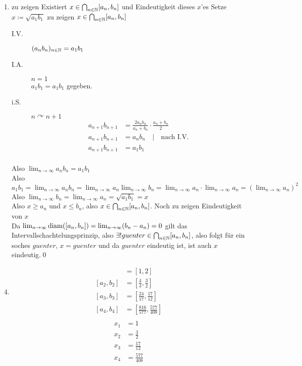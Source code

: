 \documentclass{gadsescript}
\begin{document}
\begin{proof*}
\begin{enumerate}[label=(\alph*)]
		\item zu zeigen Existiert $ x \in \bigcap_{n \in \mathbb{N}} [a_n, b_n] $ und Eindeutigkeit dieses $ x $'es
			Setze $ x \coloneqq \sqrt{a_1b_1}  $ zu zeigen $ x \in \bigcap_{n \in \mathbb{N}} [a_n, b_n] $
			\begin{description}
				\item[I.V.] $ (a_n b_n)_{n \in \mathbb{N} } = a_1b_1 $ 
				\item[I.A.] $ n = 1 $\\
					$ a_1 b_1 = a_1b_1 $ gegeben.
				\item[i.S.] $ n \curvearrowright n+1 $
					\begin{align*}
						a_{n+1}b_{n+1} &= \frac{ 2a_nb_n }{ a_n + b_n } \cdot \frac{ a_n + b_n }{ 2 } \\
						a_{n+1}b_{n+1} &= a_n b_n \quad | \quad \text{nach I.V.} \\
						a_{n+1}b_{n+1} &= a_1b_1 \\
					\end{align*}
			\end{description}
			Also $ \lim_{n \to \infty} a_nb_n = a_1b_1 $\\
			Also $ a_1b_1 = \lim_{n \to \infty} a_nb_n = \lim_{n \to \infty} a_n \lim_{n \to \infty} b_n = \lim_{n \to \infty} a_n \cdot \lim_{n \to \infty} a_n = \left( \lim_{n \to \infty} a_n \right)^2 $\\
			Also $ \lim_{n \to \infty} b_n = \lim_{n \to \infty} a_n = \sqrt{a_1b_1} = x$\\
			Also $ x \geq a_n $ und $ x \leq b_n $, also $ x \in \bigcap_{n \in \mathbb{N} } [a_n, b_n] $. Noch zu zeigen Eindeutigkeit von $ x $\\
			Da $ \lim_{n \to \infty} \operatorname{diam}([a_n, b_n]) = \lim_{n \to \infty} (b_n - a_n) = 0 $ gilt das Intervallschachtelungsprinzip, also $ \exists ! guenter \in \bigcap_{n \in \mathbb{N} } [a_n, b_n] $, also folgt für ein soches $ guenter $, $ x = guenter $ und da $ guenter $ eindeutig ist, ist auch $ x $ eindeutig.\qed
	\end{enumerate}
\end{proof*}
\begin{enumerate}[label=(\alph*)]
	\setcounter{enumi}{3}
	\item 
		\begin{align*}
			[a_1,b_1]&=[1,2]\\
			[a_2,b_2]&=\left[\frac{ 4 }{ 3 },\frac{ 3 }{ 2 }  \right]\\
			[a_3,b_3]&=\left[\frac{ 24 }{ 17 },\frac{ 17 }{ 12 }  \right]\\
			[a_4,b_4]&=\left[\frac{ 816 }{ 577 },\frac{ 577 }{ 408 }  \right]\\
		\end{align*}
		\begin{align*}
			x_1&=1\\
			x_2&=\frac{ 3 }{ 2 }\\
			x_3&=\frac{ 17 }{ 12 }\\
			x_4&=\frac{ 577 }{ 408 } \\
		\end{align*}
\end{enumerate}
\end{document}
